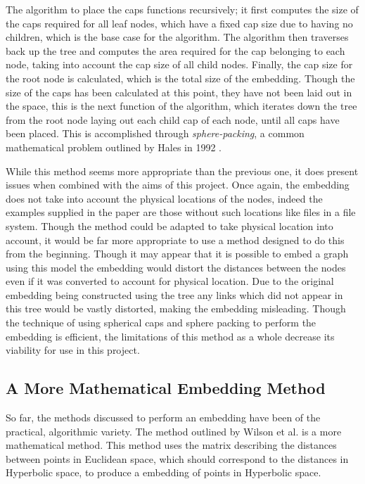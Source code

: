 The algorithm to place the caps functions recursively; it first computes the size of the caps required for all leaf nodes, which have a fixed cap size due to having no children, which is the base case for the algorithm. The algorithm then traverses back up the tree and computes the area required for the cap belonging to each node, taking into account the cap size of all child nodes. Finally, the cap size for the root node is calculated, which is the total size of the embedding. Though the size of the caps has been calculated at this point, they have not been laid out in the space, this is the next function of the algorithm, which iterates down the tree from the root node laying out each child cap of each node, until all caps have been placed. This is accomplished through \textit{sphere-packing}, a common mathematical problem outlined by Hales in 1992 \cite{hales_sphere_1992}.

While this method seems more appropriate than the previous one, it does present issues when combined with the aims of this project. Once again, the embedding does not take into account the physical locations of the nodes, indeed the examples supplied in the paper are those without such locations like files in a file system. Though the method could be adapted to take physical location into account, it would be far more appropriate to use a method designed to do this from the beginning. Though it may appear that it is possible to embed a graph using this model the embedding would distort the distances between the nodes even if it was converted to account for physical location. Due to the original embedding being constructed using the tree any links which did not appear in this tree would be vastly distorted, making the embedding misleading. Though the technique of using spherical caps and sphere packing to perform the embedding is efficient, the limitations of this method as a whole decrease its viability for use in this project.

\subsection{A More Mathematical Embedding Method}
\label{sec:hyperbolic_embedding}

So far, the methods discussed to perform an embedding have been of the practical, algorithmic variety. The method outlined by Wilson et al. \cite{wilson_spherical_2014} is a more mathematical method. This method uses the matrix describing the distances between points in Euclidean space, which should correspond to the distances in Hyperbolic space, to produce a embedding of points in Hyperbolic space.

